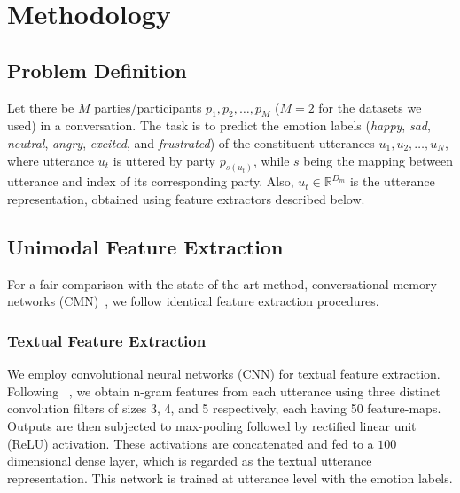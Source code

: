 \documentclass[letterpaper]{article} %
\newcommand{\citet}[1]
{\citeauthor{#1}~\shortcite{#1}}
\begin{document}
\section{Methodology}
\label{sec:method}
\subsection{Problem Definition}
\label{sec:problem-definition}

Let there be $M$ parties/participants $p_1,p_2,\dots,p_M$ ($M=2$ for the 
datasets we used) in a
conversation. The task is to predict the emotion labels (\textit{happy}, \textit{sad}, \textit{neutral},
\textit{angry}, \textit{excited}, and \textit{frustrated}) of the constituent utterances
$u_1,u_2,\dots,u_N$, where utterance $u_t$ is uttered by party $p_{s(u_t)}$,
while $s$ being the mapping between utterance and index of its corresponding
party. Also, $u_t\in \mathbb{R}^{D_m}$ is the utterance representation,
obtained using feature extractors %
described below.

\subsection{Unimodal Feature Extraction}
\label{sec:feature-extraction}

For a fair comparison with the state-of-the-art method, conversational memory networks (CMN)~\cite{hazarika-EtAl:2018:N18-1},
we follow identical feature extraction procedures.

\subsubsection{Textual Feature Extraction}
\label{sec:text-feat-extr}

We employ convolutional neural networks (CNN) for textual feature extraction. Following
\citet{kim2014convolutional}, we obtain n-gram features from each utterance using three distinct
convolution filters
of sizes 3, 4, and 5 respectively, each having 50 feature-maps. Outputs are then subjected to max-pooling followed by rectified linear unit (ReLU) activation. These activations are concatenated and fed to a $100$ dimensional dense layer, which is regarded as the textual utterance representation. This network is trained at utterance level with the emotion labels.
\end{document}
